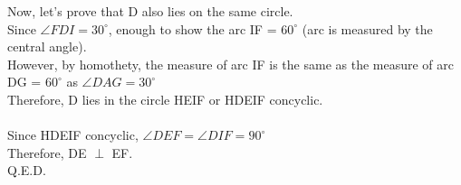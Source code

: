 \documentclass{article}
\begin{document}
Now, let's prove that D also lies on the same circle.\\
Since $\angle FDI = 30^\circ$, enough to show the arc IF = $60^\circ$ (arc is measured by the central angle).\\
However, by homothety, the measure of arc IF is the same as the measure of arc DG = $60^\circ$ as $\angle DAG =30^\circ$\\
Therefore, D lies in the circle HEIF or HDEIF concyclic.\\
\\
Since HDEIF concyclic, $\angle DEF=\angle DIF = 90^\circ$\\
Therefore, DE \(\perp\) EF.\\
Q.E.D.
\end{document}
